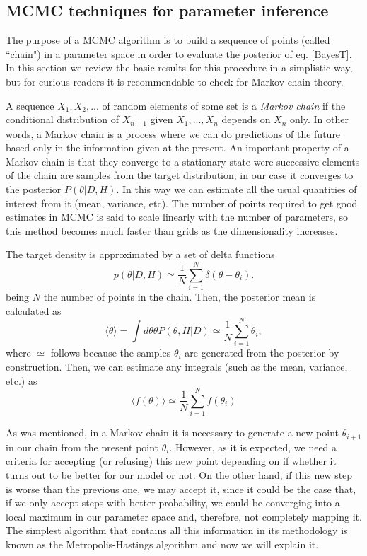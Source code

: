 \documentclass[onecolumn,           %
               showpacs,            %
               preprintnumbers,     %
               aps,                 %
               letterpaper,             %
               superscriptaddress,      %
               nofootinbib,         %
               tightenlines,        %
               floats,floatfix      %
               ,usenatbib,
               ]{revtex4-1}
\begin{document}
\subsection{MCMC techniques for parameter inference}

The purpose of a MCMC algorithm is to build a sequence of points (called ``chain") in a parameter space in order to evaluate the posterior of eq. \eqref{BayesT}. In this section we review the basic results for this procedure in a simplistic way, but for curious readers it is recommendable to check \cite{mcmc1, mcmc2, mcmc3, mcmc4} for Markov chain theory.

A sequence $X_1,X_2,...$ of random elements of some set is a \textit{Markov chain} if the conditional distribution of $X_{n+1}$ given $X_1,...,X_n$ depends on $X_n$ only. In other words, a Markov chain is a process where we can do predictions of the future based only in the information given at the present. An important property of a Markov chain is that they converge to a stationary state were successive elements of the chain are samples from the target distribution, in our case it converges to the posterior $P(\theta|D,H)$. In this way we can estimate all the usual quantities of interest from it (mean, variance, etc). The number of points required to get good estimates in MCMC is said to scale linearly with the number of parameters, so this method becomes much faster than grids as the dimensionality increases.

The target density is approximated by a set of delta functions
\begin{equation}
p(\theta|D,H)\simeq \frac{1}{N}\sum_{i=1}^N \delta(\theta-\theta_i).
\end{equation}
being $N$ the number of points in the chain. Then, the posterior mean is calculated as
\begin{equation}
\langle\theta\rangle=\int d\theta \theta P(\theta,H|D)\simeq \frac{1}{N}\sum_{i=1}^N\theta_i ,
\end{equation}
where $\simeq$ follows because the samples $\theta_i$ are generated from the posterior by construction. Then, we can estimate any integrals (such as the mean, variance, etc.) as
\begin{equation}
\langle f(\theta)\rangle \simeq\frac{1}{N}\sum_{i=1}^N f(\theta_i)
\end{equation}

As was mentioned, in a Markov chain it is necessary to generate a new point $\theta_{i+1}$ in our chain from the present point $\theta_i$. However, as it is expected, we need a criteria for accepting (or refusing) this new point depending on if whether it turns out to be better for our model or not. On the other hand, if this new step is worse than the previous one, we may accept it, since it could be the case that, if we only accept steps with better probability, we could be converging into a local maximum in our parameter space and, therefore, not completely mapping it. The simplest algorithm that contains all this information in its methodology is known as the Metropolis-Hastings algorithm and now we will explain it.
\end{document}
